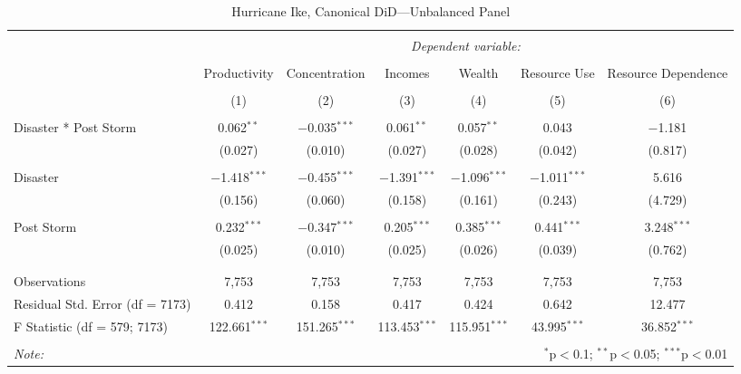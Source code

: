 
\begin{table}[!htbp] \centering 
  \caption{Hurricane Ike, Canonical DiD---Unbalanced Panel} 
  \label{} 
\footnotesize 
\begin{tabular}{@{\extracolsep{5pt}}lcccccc} 
\\[-1.8ex]\hline 
\hline \\[-1.8ex] 
 & \multicolumn{6}{c}{\textit{Dependent variable:}} \\ 
\cline{2-7} 
\\[-1.8ex] & Productivity & Concentration & Incomes & Wealth & Resource Use & Resource Dependence \\ 
\\[-1.8ex] & (1) & (2) & (3) & (4) & (5) & (6)\\ 
\hline \\[-1.8ex] 
 Disaster * Post Storm & 0.062$^{**}$ & $-$0.035$^{***}$ & 0.061$^{**}$ & 0.057$^{**}$ & 0.043 & $-$1.181 \\ 
  & (0.027) & (0.010) & (0.027) & (0.028) & (0.042) & (0.817) \\ 
  & & & & & & \\ 
 Disaster & $-$1.418$^{***}$ & $-$0.455$^{***}$ & $-$1.391$^{***}$ & $-$1.096$^{***}$ & $-$1.011$^{***}$ & 5.616 \\ 
  & (0.156) & (0.060) & (0.158) & (0.161) & (0.243) & (4.729) \\ 
  & & & & & & \\ 
 Post Storm & 0.232$^{***}$ & $-$0.347$^{***}$ & 0.205$^{***}$ & 0.385$^{***}$ & 0.441$^{***}$ & 3.248$^{***}$ \\ 
  & (0.025) & (0.010) & (0.025) & (0.026) & (0.039) & (0.762) \\ 
  & & & & & & \\ 
\hline \\[-1.8ex] 
Observations & 7,753 & 7,753 & 7,753 & 7,753 & 7,753 & 7,753 \\ 
Residual Std. Error (df = 7173) & 0.412 & 0.158 & 0.417 & 0.424 & 0.642 & 12.477 \\ 
F Statistic (df = 579; 7173) & 122.661$^{***}$ & 151.265$^{***}$ & 113.453$^{***}$ & 115.951$^{***}$ & 43.995$^{***}$ & 36.852$^{***}$ \\ 
\hline 
\hline \\[-1.8ex] 
\textit{Note:}  & \multicolumn{6}{r}{$^{*}$p$<$0.1; $^{**}$p$<$0.05; $^{***}$p$<$0.01} \\ 
\end{tabular} 
\end{table} 
